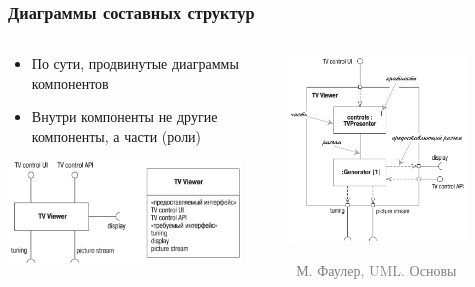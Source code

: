 \documentclass[xetex,mathserif,serif]{beamer}
\newcommand{\attribution}[1] {
	\vspace{-5mm}\begin{flushright}\begin{scriptsize}\textcolor{gray}{\textcopyright\, #1}\end{scriptsize}\end{flushright}
}
\begin{document}
	\begin{frame}
		\frametitle{Диаграммы составных структур}
		\begin{columns}
			\begin{column}{0.5\textwidth}
				\begin{itemize}
					\item По сути, продвинутые диаграммы компонентов
					\item Внутри компоненты не другие компоненты, а части (роли)
				\end{itemize}
				\vspace{3mm}
				\begin{center}
					\includegraphics[width=0.9\textwidth]{compositeStructureElement.png}
				\end{center}
			\end{column}
			\begin{column}{0.5\textwidth}
				\begin{center}
					\includegraphics[width=0.8\textwidth]{compositeStructureDiagram.png}
					\attribution{М. Фаулер, UML. Основы}
				\end{center}
			\end{column}
		\end{columns}
	\end{frame}
\end{document}
